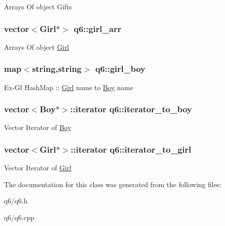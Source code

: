 Arrays Of object Gifts \hypertarget{classq6_a19e1b7bad07371e959e9cfd7feca62af}{
\subsubsection[{girl\-\_\-arr}]{\setlength{\rightskip}{0pt plus 5cm}vector$<${\bf Girl}$\ast$$>$ q6\-::girl\-\_\-arr}}\label{classq6_a19e1b7bad07371e959e9cfd7feca62af}
Arrays Of object \hyperlink{class_girl}{Girl} \hypertarget{classq6_aeca5d4e2644f377b63f47561e354f19d}{
\subsubsection[{girl\-\_\-boy}]{\setlength{\rightskip}{0pt plus 5cm}map$<$string,string$>$ q6\-::girl\-\_\-boy}}\label{classq6_aeca5d4e2644f377b63f47561e354f19d}
Ex-\/\-Gf Hash\-Map \-:\-: \hyperlink{class_girl}{Girl} name to \hyperlink{class_boy}{Boy} name \hypertarget{classq6_ade68505f0b60c3e1864109dc1005d1e7}{
\subsubsection[{iterator\-\_\-to\-\_\-boy}]{\setlength{\rightskip}{0pt plus 5cm}vector$<${\bf Boy}$\ast$$>$\-::iterator q6\-::iterator\-\_\-to\-\_\-boy}}\label{classq6_ade68505f0b60c3e1864109dc1005d1e7}
Vector Iterator of \hyperlink{class_boy}{Boy} \hypertarget{classq6_a09133b69c2da9f132de00df6a33ecd3e}{
\subsubsection[{iterator\-\_\-to\-\_\-girl}]{\setlength{\rightskip}{0pt plus 5cm}vector$<${\bf Girl}$\ast$$>$\-::iterator q6\-::iterator\-\_\-to\-\_\-girl}}\label{classq6_a09133b69c2da9f132de00df6a33ecd3e}
Vector Iterator of \hyperlink{class_girl}{Girl} 

The documentation for this class was generated from the following files\-:\begin{DoxyCompactItemize}
\item 
q6/q6.\-h\item 
q6/q6.\-cpp\end{DoxyCompactItemize}
